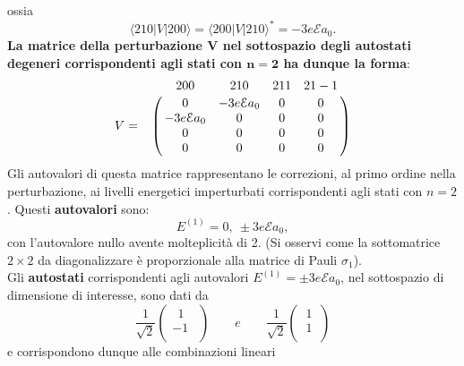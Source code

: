 \documentclass[a4paper,12pt,oneside]{book}
\begin{document}
ossia 
\begin{equation} 
\langle 210|V|200\rangle= \langle 200 |V |210 \rangle^*=-3e\mathcal{E}a_0. 
\end{equation}
\textbf{La matrice della perturbazione $\boldsymbol{V}$ nel sottospazio degli autostati degeneri corrispondenti agli stati con $\boldsymbol{n=2}$ ha dunque la forma}:
\begin{equation}  
V=
\bordermatrix{~&200&210&211&21-1\cr
& 0 & -3e\mathcal{E}a_0 & 0 & 0 \cr
& -3e\mathcal{E}a_0 & 0 & 0 & 0 \cr
& 0 & 0 & 0 & 0 \cr
& 0 & 0 & 0 & 0 \cr}
\end{equation}
Gli autovalori di questa matrice rappresentano le correzioni, al primo ordine nella perturbazione, ai livelli energetici imperturbati corrispondenti agli stati con $n=2$. Questi \textbf{autovalori} sono:
\begin{equation} 
E^{(1)}=0, \ \pm 3e\mathcal{E}a_0,
\end{equation}
con l'autovalore nullo avente molteplicità di 2. (Si osservi come la sottomatrice $2\times2$ da diagonalizzare è proporzionale alla matrice di Pauli $\sigma_1$).\\
Gli \textbf{autostati} corrispondenti agli autovalori $E^{(1)}=\pm 3e\mathcal{E}a_0$, nel sottospazio di dimensione  di interesse, sono dati da
\begin{equation} 
\frac{1}{\sqrt{2}} \left(
\begin{array}{c}
\ \ 1 \ \ \\
-1 \ \ \\
\end{array}
\right)
\qquad e \qquad 
\frac{1}{\sqrt{2}} \left(
\begin{array}{c}
\ 1 \ \\
\ 1 \ \\
\end{array}
\right)
\end{equation}
e corrispondono dunque alle combinazioni lineari 
\end{document}

